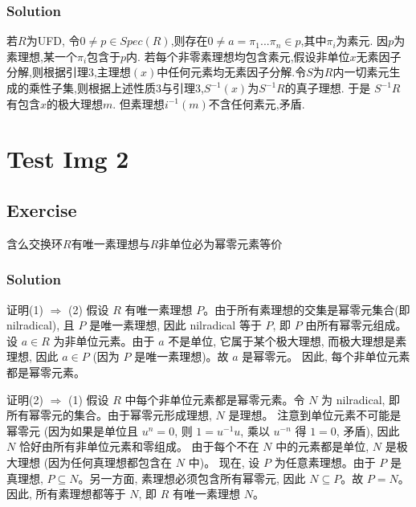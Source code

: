 \documentclass[12pt]{book}
\begin{document}
\subsection*{Solution}
若$R$为UFD, 令$0 \neq p \in Spec(R)$,则存在$0 \neq a = \pi_1 ... \pi_n \in p$,其中$\pi_i$为素元. 因$p$为素理想,某一个$\pi_i$包含于$p$内.
若每个非零素理想均包含素元,假设非单位$x$无素因子分解,则根据引理3,主理想$(x)$中任何元素均无素因子分解.令$S$为$R$内一切素元生成的乘性子集,则根据上述性质3与引理3,$S^{-1}(x)$为$S^{-1}R$的真子理想. 于是 $S^{-1}R$ 有包含$x$的极大理想$m$. 但素理想$i^{-1}(m)$不含任何素元,矛盾.
\newpage
\chapter{Test Img 2}
\section*{Exercise}
含么交换环$R$有唯一素理想与$R$非单位必为幂零元素等价



\subsection*{Solution}
证明(1) $\Rightarrow$ (2)
假设 $R$ 有唯一素理想 $P$。由于所有素理想的交集是幂零元集合(即nilradical), 且 $P$ 是唯一素理想, 因此 nilradical 等于 $P$, 即 $P$ 由所有幂零元组成。
设 $a \in R$ 为非单位元素。由于 $a$ 不是单位, 它属于某个极大理想, 而极大理想是素理想, 因此 $a \in P$ (因为 $P$ 是唯一素理想)。故 $a$ 是幂零元。
因此, 每个非单位元素都是幂零元素。

证明(2) $\Rightarrow$ (1)
假设 $R$ 中每个非单位元素都是幂零元素。令 $N$ 为 nilradical, 即所有幂零元的集合。由于幂零元形成理想, $N$ 是理想。
注意到单位元素不可能是幂零元 (因为如果是单位且 $u^n=0$, 则 $1 = u^{-1}u$, 乘以 $u^{-n}$ 得 $1=0$, 矛盾), 因此 $N$ 恰好由所有非单位元素和零组成。
由于每个不在 $N$ 中的元素都是单位, $N$ 是极大理想 (因为任何真理想都包含在 $N$ 中)。
现在, 设 $P$ 为任意素理想。由于 $P$ 是真理想, $P \subseteq N$。另一方面, 素理想必须包含所有幂零元, 因此 $N \subseteq P$。故 $P = N$。
因此, 所有素理想都等于 $N$, 即 $R$ 有唯一素理想 $N$。
\newpage
\end{document}

